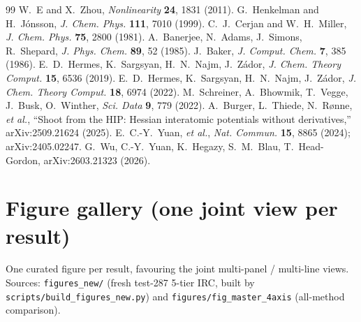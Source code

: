 \documentclass[11pt]{article}
\begin{document}
\begin{thebibliography}{99}\small
{} W.~E and X.~Zhou, \emph{Nonlinearity} \textbf{24}, 1831 (2011).
 G.~Henkelman and H.~J\'onsson, \emph{J. Chem. Phys.} \textbf{111}, 7010 (1999).
 C.~J.~Cerjan and W.~H.~Miller, \emph{J. Chem. Phys.} \textbf{75}, 2800 (1981).
 A.~Banerjee, N.~Adams, J.~Simons, R.~Shepard, \emph{J. Phys. Chem.} \textbf{89}, 52 (1985).
 J.~Baker, \emph{J. Comput. Chem.} \textbf{7}, 385 (1986).
 E.~D.~Hermes, K.~Sargsyan, H.~N.~Najm, J.~Z\'ador, \emph{J. Chem. Theory Comput.} \textbf{15}, 6536 (2019).
 E.~D.~Hermes, K.~Sargsyan, H.~N.~Najm, J.~Z\'ador, \emph{J. Chem. Theory Comput.} \textbf{18}, 6974 (2022).
 M.~Schreiner, A.~Bhowmik, T.~Vegge, J.~Busk, O.~Winther, \emph{Sci. Data} \textbf{9}, 779 (2022).
 A.~Burger, L.~Thiede, N.~R{\o}nne, \emph{et al.}, ``Shoot from the HIP: Hessian interatomic potentials without derivatives,'' arXiv:2509.21624 (2025).
 E.~C.-Y.~Yuan, \emph{et al.}, \emph{Nat. Commun.} \textbf{15}, 8865 (2024); arXiv:2405.02247.
 G.~Wu, C.-Y.~Yuan, K.~Hegazy, S.~M.~Blau, T.~Head-Gordon, arXiv:2603.21323 (2026).
\end{thebibliography}


\clearpage
\section{Figure gallery (one joint view per result)}\label{app:gallery}
One curated figure per result, favouring the joint multi-panel / multi-line views. Sources: \texttt{figures\_new/} (fresh test-287 5-tier IRC, built by \texttt{scripts/build\_figures\_new.py}) and \texttt{figures/fig\_master\_4axis} (all-method comparison).
\end{document}
